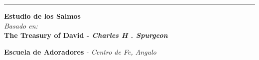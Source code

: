 \begin{titlepage}
  \raggedleft
  \rule{1pt}{\textheight}
  \hspace{0.05\textwidth}
  \parbox[b]{0.75\textwidth}{

    {\Huge\bfseries Estudio de los Salmos }\\[4\baselineskip]
    {\large\textit{Basado en:}}\\[2\baselineskip]
    {\Large\textbf{The Treasury of David} \textit{\textbf{ - Charles H
   . Spurgeon}}}

    \vspace{0.5\textheight}

    {\noindent
      \textbf{Escuela de Adoradores}
      \textit{ - Centro de Fe, Angulo}}\\[\baselineskip]}

\end{titlepage}
